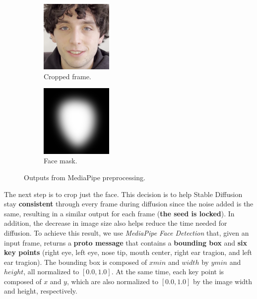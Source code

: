 \documentclass[preprint]{elsarticle}
\begin{document}
\begin{figure}[t]
	\centering
	\begin{subfigure}[b]{0.5\textwidth}
		\centering
		\includegraphics[width=3.5cm, keepaspectratio]{img/project_img/cropped.png}
		\caption{Cropped frame.}\label{fig:cropped}
	\end{subfigure}%
	\hfill
	\begin{subfigure}[b]{0.5\textwidth}
		\centering
		\includegraphics[width=3.5cm, keepaspectratio]{img/project_img/mask-blur.png}
		\caption{Face mask.}\label{fig:mask}
	\end{subfigure}
	\caption{Outputs from MediaPipe preprocessing.}\label{fig:project-mediapipe}
\end{figure}


The next step is to crop just the face.  This decision is to help Stable Diffusion stay \textbf{consistent} through every frame during diffusion since the noise added is the same,  resulting in a similar output for each frame (\textbf{the seed is locked}).  In addition, the decrease in image size also helps reduce the time needed for diffusion. 
To achieve this result, we use \emph{MediaPipe Face Detection} that, given an input frame,  returns a \textbf{proto message} that contains a \textbf{bounding box} and \textbf{six key points} (right eye, left eye, nose tip, mouth center, right ear tragion, and left ear tragion). 
The bounding box is composed of $xmin$ and $width$ by $ymin$ and $height$, all normalized to $[0.0, 1.0]$. 
At the same time, each key point is composed of $x$ and $y$, which are also normalized to $[0.0, 1.0]$ by the image width and height, respectively. 

\FloatBarrier
\end{document}
